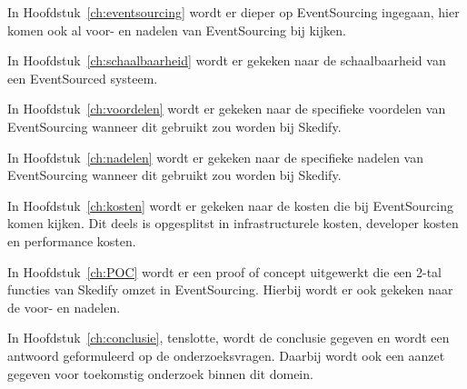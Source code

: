 In Hoofdstuk~\ref{ch:eventsourcing} wordt er dieper op EventSourcing ingegaan, hier komen ook al voor- en nadelen van EventSourcing bij kijken.

In Hoofdstuk~\ref{ch:schaalbaarheid} wordt er gekeken naar de schaalbaarheid van een EventSourced systeem.

In Hoofdstuk~\ref{ch:voordelen} wordt er gekeken naar de specifieke voordelen van EventSourcing wanneer dit gebruikt zou worden bij Skedify.

In Hoofdstuk~\ref{ch:nadelen} wordt er gekeken naar de specifieke nadelen van EventSourcing wanneer dit gebruikt zou worden bij Skedify.

In Hoofdstuk~\ref{ch:kosten} wordt er gekeken naar de kosten die bij EventSourcing komen kijken. Dit deels is opgesplitst in infrastructurele kosten, developer kosten en performance kosten.

In Hoofdstuk~\ref{ch:POC} wordt er een proof of concept uitgewerkt die een 2-tal functies van Skedify omzet in EventSourcing. Hierbij wordt er ook gekeken naar de voor- en nadelen.

In Hoofdstuk~\ref{ch:conclusie}, tenslotte, wordt de conclusie gegeven en wordt een antwoord geformuleerd op de onderzoeksvragen. Daarbij wordt ook een aanzet gegeven voor toekomstig onderzoek binnen dit domein.

